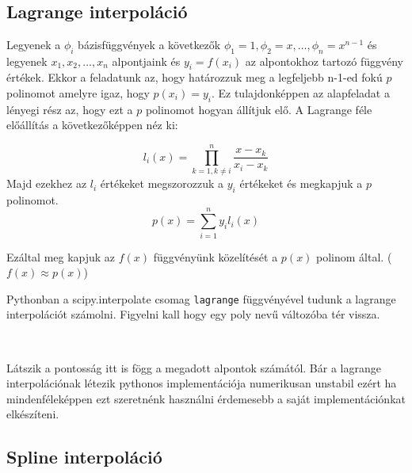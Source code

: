     \begin{center}
    \end{center}
    { \hspace*{\fill} \\}
    
    \subsection{Lagrange interpoláció}\label{lagrange-interpoluxe1ciuxf3}

    Legyenek a \(\phi_i\) bázisfüggvények a következők
\(\phi_1=1, \phi_2=x, \dots , \phi_n=x^{n-1}\) és legyenek
\(x_1, x_2,\dots, x_n\) alpontjaink és \(y_i=f(x_i)\) az alpontokhoz
tartozó függvény értékek. Ekkor a feladatunk az, hogy határozzuk meg a
legfeljebb n-1-ed fokú \(p\) polinomot amelyre igaz, hogy
\(p(x_i)=y_i\). Ez tulajdonképpen az alapfeladat a lényegi rész az, hogy
ezt a \(p\) polinomot hogyan állítjuk elő. A Lagrange féle előállítás a
következőképpen néz ki:

    \[
l_i(x)=\prod_{k=1, k\neq i}^n\frac{x-x_k}{x_i-x_k}
\] Majd ezekhez az \(l_i\) értékeket megszorozzuk a \(y_i\) értékeket és
megkapjuk a \(p\) polinomot. \[
p(x)=\sum_{i=1}^n y_il_i(x)
\]

    Ezáltal meg kapjuk az \(f(x)\) függvényünk közelítését a \(p(x)\)
polinom által. (\(f(x) \approx p(x)\))

    Pythonban a scipy.interpolate csomag \texttt{lagrange} függvényével
tudunk a lagrange interpolációt számolni. Figyelni kall hogy egy poly
nevű változóba tér vissza.

\begin{python}

\end{python}

    \begin{center}
    \end{center}
    { \hspace*{\fill} \\}
    
    Látszik a pontosság itt is fögg a megadott alpontok számától. Bár a
lagrange interpolációnak létezik pythonos implementációja numerikusan
unstabil ezért ha mindenféleképpen ezt szeretnénk használni érdemesebb a
saját implementációnkat elkészíteni.

    \subsection{Spline interpoláció}\label{spline-interpoluxe1ciuxf3}

